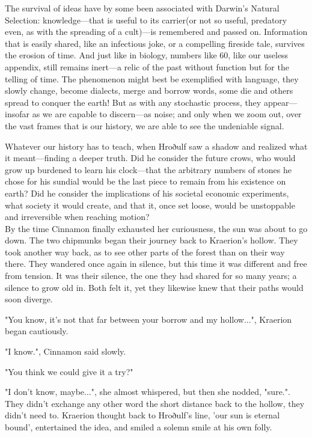 \renewcommand*{\thepage}{\footnotesize \arabic{page}}

The survival of ideas have by some been associated with Darwin's Natural Selection: knowledge---that is useful to its carrier(or not so useful, predatory even, as with the spreading of a cult)---is remembered and passed on. Information that is easily shared, like an infectious joke, or a compelling fireside tale, survives the erosion of time. And just like in biology, numbers like 60, like our useless appendix, still remains inert---a relic of the past without function but for the telling of time. The phenomenon might best be exemplified with language, they slowly change, become dialects, merge and borrow words, some die and others spread to conquer the earth! But as with any stochastic process, they appear---insofar as we are capable to discern---as noise; and only when we zoom out, over the vast frames that is our history, we are able to see the undeniable signal.

Whatever our history has to teach, when Hroðulf saw a shadow and realized what it meant---finding a deeper truth. Did he consider the future crows, who would grow up burdened to learn his clock---that the arbitrary numbers of stones he chose for his sundial would be the last piece to remain from his existence on earth?
Did he consider the implications of his societal economic experiments, what society it would create, and that it, once set loose, would be unstoppable and irreversible when reaching motion?\\

By the time Cinnamon finally exhausted her curiousness, the sun was about to go down. The two chipmunks began their journey back to Kraerion's hollow. They took another way back, as to see other parts of the forest than on their way there. They wandered once again in silence, but this time it was different and free from tension. It was their silence, the one they had shared for so many years; a silence to grow old in. Both felt it, yet they likewise knew that their paths would soon diverge.

"You know, it's not that far between your borrow and my hollow...", Kraerion began cautiously.

"I know.", Cinnamon said slowly.

"You think we could give it a try?"

"I don't know, maybe...", she almost whispered, but then she nodded, "sure.". They didn't exchange any other word the short distance back to the hollow, they didn't need to. Kraerion thought back to Hroðulf's line, 'our sun is eternal bound', entertained the idea, and smiled a solemn smile at his own folly.
